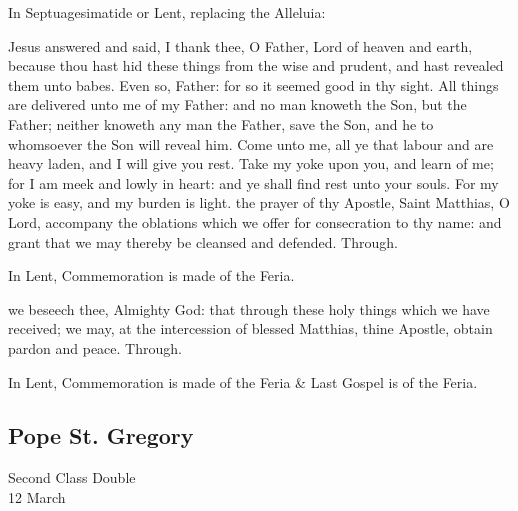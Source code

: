 \begin{rubric}
{In Septuagesimatide or Lent, replacing the Alleluia:}
\end{rubric}\par\noindent


 Jesus answered and said, I thank thee, O Father, Lord of heaven and earth, because thou hast hid these things from the wise and prudent, and hast revealed them unto babes. Even so, Father: for so it seemed good in thy sight. All things are delivered unto me of my Father: and no man knoweth the Son, but the Father; neither knoweth any man the Father, save the Son, and he to whomsoever the Son will reveal him. Come unto me, all ye that labour and are heavy laden, and I will give you rest. Take my yoke upon you, and learn of me; for I am meek and lowly in heart: and ye shall find rest unto your souls. For my yoke is easy, and my burden is light.
\secret
{} the prayer of thy Apostle, Saint Matthias, O Lord, accompany the oblations which we offer for consecration to thy name: and grant that we may thereby be cleansed and defended. Through.
\begin{rubric}
    In Lent, Commemoration is made of the Feria.%
\end{rubric}
\postcommunion
{} we beseech thee, Almighty God: that through these holy things which we have received; we may, at the intercession of blessed Matthias, thine Apostle, obtain pardon and peace. Through.
\begin{rubric}
    In Lent, Commemoration is made of the Feria \& Last Gospel is of the Feria.
\end{rubric}

\clearpage
\subsection{Pope St. Gregory}
\begin{inhead}
    {Second Class Double\\
12 March}
\end{inhead}

